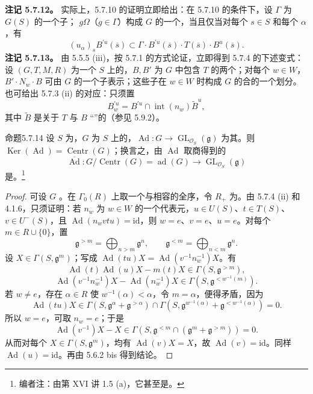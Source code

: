 \textbf{注记 5.7.12。} 实际上，5.7.10 的证明立即给出：在 5.7.10 的条件下，设 $\Gamma$ 为 $G(S)$ 的一个子； $g\Omega$（$g\in\Gamma$）构成 $G$ 的一个，当且仅当对每个 $s\in S$ 和每个 $\alpha$，有
\[(u_\alpha)_sB^{\prime u}(\overline s)\subset\Gamma\cdot B^{\prime u}(\overline s)\cdot T(\overline s)\cdot B^u(\overline s).\]
\textbf{注记 5.7.13。} 由 5.5.5 (iii)，按 5.7.1 的方式论证，立即得到 5.7.4 的下述变式：设 $(G,T,M,R)$ 为一个 $S$ 上的，$B,B'$ 为 $G$ 中包含 $T$ 的两个；对每个 $w\in W$， $B'\cdot N_w\cdot B$ 可由 $G$ 的一个子表示；这些子在 $w\in W$ 时构成 $G$ 的合的一个划分。也可给出 5.7.3 (ii) 的对应：只须置
\[B_w^{\prime u}=B^{\prime u}\cap\operatorname{int}(n_w)\widetilde B^u,\]
其中 $\widetilde B$ 是关于 $T$ 与 $B$ “”的（参见 5.9.2）。
\begin{SGAresult}{命题}{5.7.14}
设 $S$ 为，$G$ 为 $S$ 上的，$\operatorname{Ad}:G\to\operatorname{GL}_{\mathcal O_S}(\mathfrak g)$ 为其。则 $\operatorname{Ker}(\operatorname{Ad})=\operatorname{Centr}(G)$；换言之，由 $\operatorname{Ad}$ 取商得到的
\[\overline{\operatorname{Ad}}:G/\operatorname{Centr}(G)=\operatorname{ad}(G)\longrightarrow\operatorname{GL}_{\mathcal O_S}(\mathfrak g)\]
是。\footnote{编者注：由第 XVI 讲 1.5 (a)，它甚至是。}
\end{SGAresult}
\begin{proof}
可设 $G$ 。在 $\Gamma_0(R)$ 上取一个与相容的全序，令 $R_+$ 为。由 5.7.4 (ii) 和 4.1.6，只须证明：若 $n_w$ 为 $w\in W$ 的一个代表元，$u\in U(S)$、$t\in T(S)$、$v\in U^-(S)$，且 $\operatorname{Ad}(n_wvtu)=\mathrm{id}$，则 $w=e$、$v=e$、$u=e$。对每个 $m\in R\cup\{0\}$，置
\[\mathfrak g^{>m}=\bigoplus_{n>m}\mathfrak g^n,\qquad\mathfrak g^{<m}=\bigoplus_{n<m}\mathfrak g^n.\]
设 $X\in\Gamma(S,\mathfrak g^m)$；写成 $\operatorname{Ad}(tu)X=\operatorname{Ad}(v^{-1}n_w^{-1})X$。有
\[\operatorname{Ad}(t)\operatorname{Ad}(u)X-m(t)X\in\Gamma(S,\mathfrak g^{>m}),\]
\[\operatorname{Ad}(v^{-1}n_w^{-1})X-\operatorname{Ad}(n_w^{-1})X\in\Gamma(S,\mathfrak g^{<w^{-1}(m)}).\]
若 $w\ne e$，存在 $\alpha\in R$ 使 $w^{-1}(\alpha)<\alpha$，令 $m=\alpha$，便得矛盾，因为
\[\operatorname{Ad}(tu)X\in\Gamma(S,\mathfrak g^\alpha+\mathfrak g^{>\alpha})\cap\Gamma(S,\mathfrak g^{w^{-1}(\alpha)}+\mathfrak g^{<w^{-1}(\alpha)})=0.\]
所以 $w=e$，可取 $n_w=e$；于是
\[\operatorname{Ad}(v^{-1})X-X\in\Gamma(S,\mathfrak g^{<m}\cap(\mathfrak g^m+\mathfrak g^{>m}))=0.\]
从而对每个 $X\in\Gamma(S,\mathfrak g^m)$，均有 $\operatorname{Ad}(v)X=X$，故 $\operatorname{Ad}(v)=\mathrm{id}$。同样 $\operatorname{Ad}(u)=\mathrm{id}$。再由 5.6.2 bis 得到结论。
\end{proof}
